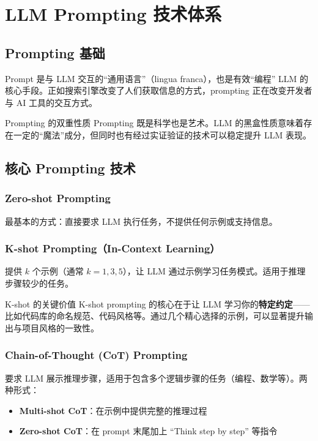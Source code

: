 \section{LLM Prompting 技术体系}

\subsection{Prompting 基础}

Prompt 是与 LLM 交互的``通用语言''（lingua franca），也是有效``编程'' LLM 的核心手段。正如搜索引擎改变了人们获取信息的方式，prompting 正在改变开发者与 AI 工具的交互方式。

\begin{knowledgebox}{Prompting 的双重性质}
Prompting 既是科学也是艺术。LLM 的黑盒性质意味着存在一定的``魔法''成分，但同时也有经过实证验证的技术可以稳定提升 LLM 表现。
\end{knowledgebox}

\subsection{核心 Prompting 技术}

\subsubsection{Zero-shot Prompting}

最基本的方式：直接要求 LLM 执行任务，不提供任何示例或支持信息。

\subsubsection{K-shot Prompting（In-Context Learning）}

提供 $k$ 个示例（通常 $k = 1, 3, 5$），让 LLM 通过示例学习任务模式。适用于推理步骤较少的任务。

\begin{importantbox}{K-shot 的关键价值}
K-shot prompting 的核心在于让 LLM 学习你的\textbf{特定约定}——比如代码库的命名规范、代码风格等。通过几个精心选择的示例，可以显著提升输出与项目风格的一致性。
\end{importantbox}

\subsubsection{Chain-of-Thought (CoT) Prompting}

要求 LLM 展示推理步骤，适用于包含多个逻辑步骤的任务（编程、数学等）。两种形式：
\begin{itemize}
    \item \textbf{Multi-shot CoT}：在示例中提供完整的推理过程
    \item \textbf{Zero-shot CoT}：在 prompt 末尾加上 ``Think step by step'' 等指令
\end{itemize}

